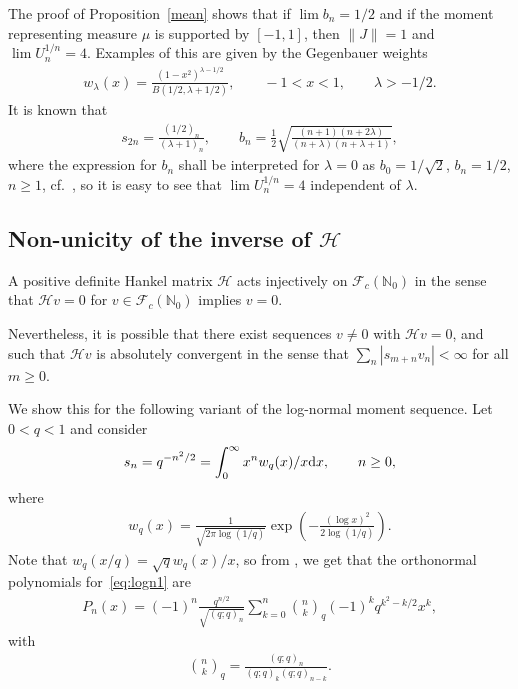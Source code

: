 \documentclass[pdftex]{sigma}
\newcommand{\N}{\mathbb{N}}
\numberwithin{equation}{section}
\begin{document}
\begin{rem}\label{thm:Geg}\rm The proof of Proposition~\ref{mean} shows that if $\lim b_n=1/2$ and if the moment representing measure $\mu$ is supported by $[-1,1]$, then $\|J\|=1$ and $\lim U_n^{1/n}=4$. Examples of this are given by the Gegenbauer weights
\begin{gather*}
w_\lambda(x)=\frac{(1-x^2)^{\lambda-1/2}}{B(1/2,\lambda+1/2)},\qquad -1<x<1,\qquad \lambda>-1/2.
\end{gather*}
It is known that
\begin{gather*}
s_{2n}=\frac{(1/2)_n}{(\lambda+1)_n},\qquad b_n=\frac12\sqrt{\frac{(n+1)(n+2\lambda)}{(n+\lambda)(n+\lambda+1)}},
\end{gather*}
where the expression for $b_n$ shall be interpreted for $\lambda=0$ as $b_0=1/\sqrt{2}$, $b_n=1/2$, $n \ge 1$, cf.~\cite{K:S}, so it is easy to see that $\lim U_n^{1/n}=4$ independent of $\lambda$.
\end{rem}

\subsection[Non-unicity of the inverse of $\mathcal H$]{Non-unicity of the inverse of $\boldsymbol{\mathcal H}$}

A positive definite Hankel matrix $\mathcal H$ acts injectively on $\mathcal F_c(\N_0)$ in the sense that $\mathcal Hv=0$ for $v\in \mathcal F_c(\N_0)$ implies $v=0$.

Nevertheless, it is possible that there exist sequences $v\neq 0$ with $\mathcal H v=0$, and such that $\mathcal H v$ is absolutely convergent in the sense that $\sum_n |s_{m+n}v_n| <\infty$ for all $m\ge 0$.

We show this for the following variant of the log-normal moment sequence. Let $0<q<1$ and consider
\begin{gather}\label{eq:logn1}
s_n=q^{-n^2/2}=\int_0^\infty x^n w_q(x)/x{\rm d}x,\qquad n\ge 0,
\end{gather}
where
\begin{gather*}
 w_q(x)=\frac{1}{\sqrt{2\pi\log(1/q)}} \exp\left(-\frac{(\log x)^2}{2\log(1/q)}\right).
\end{gather*}
Note that $w_q(x/q)=\sqrt{q} w_q(x)/x$, so from \cite[equation~(42)]{B:S1}, we get that the orthonormal polynomials for~\eqref{eq:logn1} are
\begin{gather}\label{eq:logn3}
P_n(x)=(-1)^n\frac{q^{n/2}}{\sqrt{(q;q)_n}}\sum_{k=0}^n\binom{n}{k}_q (-1)^kq^{k^2-k/2} x^k,
\end{gather}
with
\begin{gather*}
\binom{n}{k}_q=\frac{(q;q)_n}{(q;q)_k (q;q)_{n-k}}.
\end{gather*}
\end{document}
